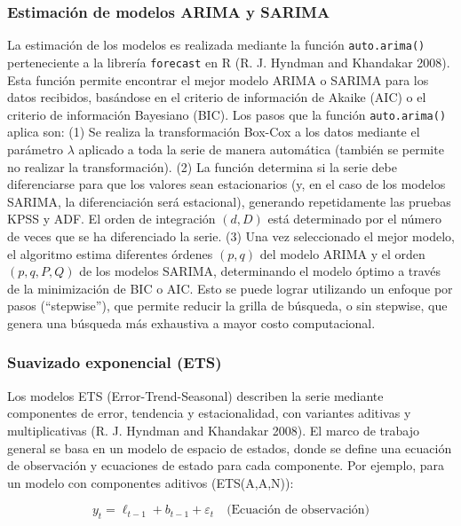 \documentclass[
  12pt, a4paper, oneside]{article}
\begin{document}
\subsubsection{Estimación de modelos ARIMA y SARIMA}\label{estimaciuxf3n-de-modelos-arima-y-sarima}

La estimación de los modelos es realizada mediante la función \texttt{auto.arima()} perteneciente a la librería \texttt{forecast} en R (R. J. Hyndman and Khandakar 2008). Esta función permite encontrar el mejor modelo ARIMA o SARIMA para los datos recibidos, basándose en el criterio de información de Akaike (AIC) o el criterio de información Bayesiano (BIC). Los pasos que la función \texttt{auto.arima()} aplica son: (1) Se realiza la transformación Box-Cox a los datos mediante el parámetro \(\lambda\) aplicado a toda la serie de manera automática (también se permite no realizar la transformación). (2) La función determina si la serie debe diferenciarse para que los valores sean estacionarios (y, en el caso de los modelos SARIMA, la diferenciación será estacional), generando repetidamente las pruebas KPSS y ADF. El orden de integración \((d, D)\) está determinado por el número de veces que se ha diferenciado la serie. (3) Una vez seleccionado el mejor modelo, el algoritmo estima diferentes órdenes \((p, q)\) del modelo ARIMA y el orden \((p, q, P, Q)\) de los modelos SARIMA, determinando el modelo óptimo a través de la minimización de BIC o AIC. Esto se puede lograr utilizando un enfoque por pasos (``stepwise''), que permite reducir la grilla de búsqueda, o sin stepwise, que genera una búsqueda más exhaustiva a mayor costo computacional.

\subsubsection{Suavizado exponencial (ETS)}\label{suavizado-exponencial-ets}

Los modelos ETS (Error-Trend-Seasonal) describen la serie mediante componentes de error, tendencia y estacionalidad, con variantes aditivas y multiplicativas (R. J. Hyndman and Khandakar 2008). El marco de trabajo general se basa en un modelo de espacio de estados, donde se define una ecuación de observación y ecuaciones de estado para cada componente. Por ejemplo, para un modelo con componentes aditivos (ETS(A,A,N)):

\begin{equation}
y_t = \ell_{t-1} + b_{t-1} + \varepsilon_t \quad \text{(Ecuación de observación)}
\end{equation}
\end{document}
